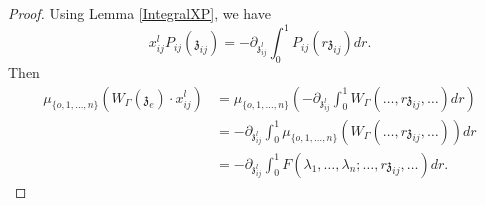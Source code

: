 \documentclass[11pt]{amsart}
\theoremstyle{definition}
\theoremstyle{remark}
\numberwithin{equation}{section}
\begin{document}
\begin{proof}

Using Lemma \ref{IntegralXP}, we have
$$
x^l_{ij}P_{ij}(\mathfrak{z}_{ij})=-\partial_{\mathfrak{z}^l_{ij}}\int^1_0P_{ij}(r\mathfrak{z}_{ij})dr.
$$
Then
\begin{align*}
   \mu_{\{o,1,\dots, n\}}\left(W_{\Gamma}(\mathfrak{z}_{e})\cdot x^l_{ij}\right)  &=\mu_{\{o,1,\dots, n\}}\left(-\partial_{\mathfrak{z}^l_{ij}}\int^1_0W_{\Gamma}(\dots,r\mathfrak{z}_{ij},\dots)dr\right)  \\
   & =-\partial_{\mathfrak{z}^l_{ij}}\int^1_0\mu_{\{o,1,\dots, n\}}\left(W_{\Gamma}(\dots,r\mathfrak{z}_{ij},\dots)\right)dr\\
   &=-\partial_{\mathfrak{z}^l_{ij}}\int^1_0F(\lambda_1,\dots,\lambda_{n};\dots,r\mathfrak{z}_{ij},\dots)dr.
\end{align*}
\end{proof}
\end{document}
